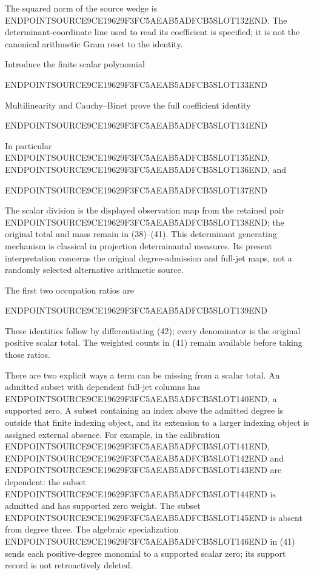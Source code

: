 The squared norm of the source wedge is ENDPOINTSOURCE9CE19629F3FC5AEAB5ADFCB5SLOT132END. The determinant-coordinate line used to read its coefficient is specified; it is not the canonical arithmetic Gram reset to the identity.

Introduce the finite scalar polynomial

ENDPOINTSOURCE9CE19629F3FC5AEAB5ADFCB5SLOT133END

Multilinearity and Cauchy--Binet prove the full coefficient identity

ENDPOINTSOURCE9CE19629F3FC5AEAB5ADFCB5SLOT134END

In particular ENDPOINTSOURCE9CE19629F3FC5AEAB5ADFCB5SLOT135END, ENDPOINTSOURCE9CE19629F3FC5AEAB5ADFCB5SLOT136END, and

ENDPOINTSOURCE9CE19629F3FC5AEAB5ADFCB5SLOT137END

The scalar division is the displayed observation map from the retained pair ENDPOINTSOURCE9CE19629F3FC5AEAB5ADFCB5SLOT138END; the original total and mass remain in (38)--(41). This determinant generating mechanism is classical in projection determinantal measures. Its present interpretation concerns the original degree-admission and full-jet maps, not a randomly selected alternative arithmetic source.

The first two occupation ratios are

ENDPOINTSOURCE9CE19629F3FC5AEAB5ADFCB5SLOT139END

These identities follow by differentiating (42); every denominator is the original positive scalar total. The weighted counts in (41) remain available before taking those ratios.

There are two explicit ways a term can be missing from a scalar total. An admitted subset with dependent full-jet columns has ENDPOINTSOURCE9CE19629F3FC5AEAB5ADFCB5SLOT140END, a supported zero. A subset containing an index above the admitted degree is outside that finite indexing object, and its extension to a larger indexing object is assigned external absence. For example, in the calibration ENDPOINTSOURCE9CE19629F3FC5AEAB5ADFCB5SLOT141END, ENDPOINTSOURCE9CE19629F3FC5AEAB5ADFCB5SLOT142END and ENDPOINTSOURCE9CE19629F3FC5AEAB5ADFCB5SLOT143END are dependent: the subset ENDPOINTSOURCE9CE19629F3FC5AEAB5ADFCB5SLOT144END is admitted and has supported zero weight. The subset ENDPOINTSOURCE9CE19629F3FC5AEAB5ADFCB5SLOT145END is absent from degree three. The algebraic specialization ENDPOINTSOURCE9CE19629F3FC5AEAB5ADFCB5SLOT146END in (41) sends each positive-degree monomial to a supported scalar zero; its support record is not retroactively deleted.

